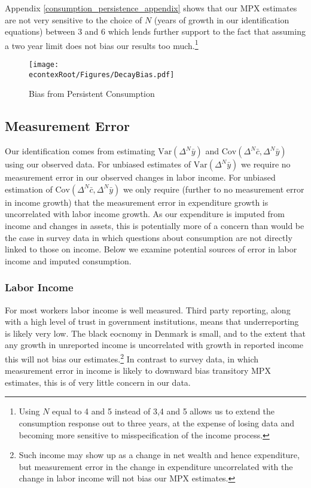 \documentclass[titlepage]{\econtex}\newcommand{\texname}{ConsumptionHeterogeneity}
\begin{document}
Appendix \ref{consumption_persistence_appendix} shows that our MPX estimates are not very sensitive to the choice of $N$ (years of growth in our identification equations) between 3 and 6 which lends further support to the fact that assuming a two year limit does not bias our results too much.\footnote{Using $N$ equal to 4 and 5 instead of 3,4 and 5 allows us to extend the consumption response out to three years, at the expense of losing data and becoming more sensitive to misspecification of the income process.}
\begin{figure} 
	\begin{centering}
		\texttt{[image: \\econtexRoot/Figures/DecayBias.pdf]}
		\caption{Bias from Persistent Consumption}
		\label{fig:DecayBias}
	\end{centering}
\end{figure}

\subsection{Measurement Error} \label{Measurement_error}
Our identification comes from estimating $\mathrm{Var}(\Delta^N \bar{y})$ and $\mathrm{Cov}(\Delta^N \bar{c},\Delta^N \bar{y})$ using our observed data. For unbiased estimates of $\mathrm{Var}(\Delta^N \bar{y})$ we require no measurement error in our observed changes in labor income. For unbiased estimation of $\mathrm{Cov}(\Delta^N \bar{c},\Delta^N \bar{y})$ we only require (further to no measurement error in income growth) that the measurement error in expenditure growth is uncorrelated with labor income growth. As our expenditure is imputed from income and changes in assets, this is potentially more of a concern than would be the case in survey data in which questions about consumption are not directly linked to those on income. Below we examine potential sources of error in labor income and imputed consumption.

\subsubsection{Labor Income}
For most workers labor income is well measured. Third party reporting, along with a high level of trust in government institutions, means that underreporting is likely very low. The black eocnomy in Denmark is small, and to the extent that any growth in unreported income is uncorrelated with growth in reported income this will not bias our estimates.\footnote{Such income may show up as a change in net wealth and hence expenditure, but measurement error in the change in expenditure uncorrelated with the change in labor income will not bias our MPX estimates.} In contrast to survey data, in which measurement error in income is likely to downward bias transitory MPX estimates, this is of very little concern in our data.
\end{document}
